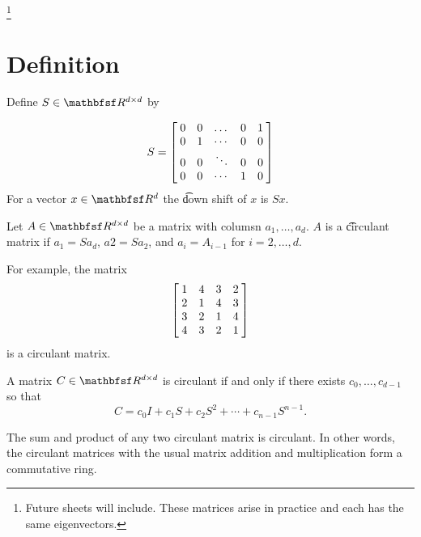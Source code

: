 
\footnote{Future sheets will include. These matrices arise in practice and each has the same eigenvectors.}

\section{Definition}

Define $S \in \R^{d \times d}$ by

\[
  S = \bmat{
    0 & 0 & \dots & 0 & 1 \\
    0 & 1 & \cdots & 0 & 0 \\
    0 & 0 & \ddots & 0 & 0 \\
    0 & 0 & \cdots & 1 & 0
  }
\]
For a vector $x \in \R^d$ the \t{down shift} of $x$ is $Sx$.

Let $A \in \R^{d \times d}$ be a matrix with columsn $a_1, \dots, a_d$.
$A$ is a \t{circulant matrix} if $a_1 = Sa_d$, $a2 = Sa_2$, and $a_i = A_{i -1}$ for $i = 2, \dots, d$.


For example, the matrix
\[
  \bmat{
    1 & 4 & 3 & 2 \\
    2 & 1 & 4 & 3 \\
    3 & 2 & 1 & 4 \\
    4 & 3 & 2 & 1 \\
  }
\]
is a circulant matrix.


A matrix $C \in \R^{d \times d}$ is circulant if and only if there exists $c_0, \dots, c_{d-1}$ so that
\[
  C = c_0I + c_1 S + c_2S^2 + \cdots + c_{n-1}S^{n-1}.
\]


The sum and product of any two circulant matrix is circulant.
In other words, the circulant matrices with the usual matrix addition and multiplication form a commutative ring.

\blankpage
